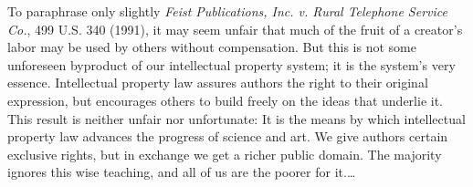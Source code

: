  To paraphrase only slightly \emph{Feist Publications, Inc. v. Rural Telephone
Service Co.}, 499 U.S. 340  (1991), it may seem unfair that much of the fruit of
a creator's labor may be used by others without compensation. But this is not
some unforeseen byproduct of our intellectual property system; it is the
system's very essence. Intellectual property law assures authors the right to
their original expression, but encourages others to build freely on the ideas
that underlie it. This result is neither unfair nor unfortunate: It is the
means by which intellectual property law advances the progress of science and
art. We give authors certain exclusive rights, but in exchange we get a richer
public domain. The majority ignores this wise teaching, and all of us are the
poorer for it.\dots


